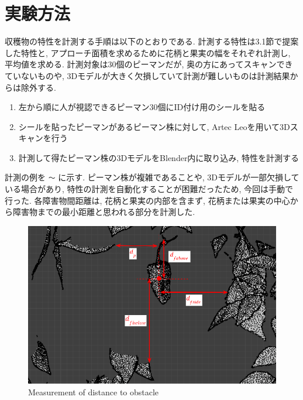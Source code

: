 \section{実験方法}
収穫物の特性を計測する手順は以下のとおりである.
計測する特性は3.1節で提案した特性と, アプローチ面積を求めるために花柄と果実の幅をそれぞれ計測し, 平均値を求める.
計測対象は30個のピーマンだが, 奥の方にあってスキャンできていないものや, 3Dモデルが大きく欠損していて計測が難しいものは計測結果からは除外する.

\begin{enumerate}
  \item 左から順に人が視認できるピーマン30個にID付け用のシールを貼る
  \item シールを貼ったピーマンがあるピーマン株に対して, Artec Leoを用いて3Dスキャンを行う
  \item 計測して得たピーマン株の3DモデルをBlender内に取り込み, 特性を計測する
\end{enumerate}

計測の例を  \verb|〜|  に示す. 
ピーマン株が複雑であることや, 3Dモデルが一部欠損している場合があり, 特性の計測を自動化することが困難だったため, 今回は手動で行った.
各障害物間距離は, 花柄と果実の内部を含まず, 花柄または果実の中心から障害物までの最小距離と思われる部分を計測した.

\vspace{5mm}
\begin{figure}[H]
     \centering
     \includegraphics[width=\columnwidth]{images/png/measurement1.png}
     \caption{Measurement of distance to obstacle}
     \label{Fig:measurement1}
\end{figure}

